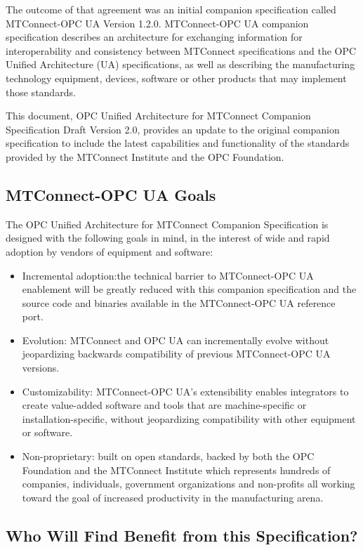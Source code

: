 \documentclass{mtconnect}	%
\begin{document}
The outcome of that agreement was an initial companion specification called MTConnect-OPC UA Version 1.2.0. MTConnect-OPC UA companion specification describes an architecture for exchanging information for interoperability and consistency between MTConnect specifications and the OPC Unified Architecture (UA) specifications, as well as describing the manufacturing technology equipment, devices, software or other products that may implement those standards.

This document, OPC Unified Architecture for MTConnect Companion Specification Draft Version 2.0, provides an update to the original companion specification to include the latest capabilities and functionality of the standards provided by the MTConnect Institute and the OPC Foundation.

\subsection{MTConnect-OPC UA Goals}

The OPC Unified Architecture for MTConnect Companion Specification is designed with the following goals in mind, in the interest of wide and rapid adoption by vendors of equipment and software:

\begin{itemize}
    \item Incremental adoption:the technical barrier to MTConnect-OPC UA enablement will be greatly reduced with this companion specification and the source code and binaries available in the MTConnect-OPC UA reference port.
    \item Evolution: MTConnect and OPC UA can incrementally evolve without jeopardizing backwards compatibility of previous MTConnect-OPC UA versions.
    \item Customizability: MTConnect-OPC UA's extensibility enables integrators to create value-added software and tools that are machine-specific or installation-specific, without jeopardizing compatibility with other equipment or software.
    \item Non-proprietary: built on open standards, backed by both the OPC Foundation and the MTConnect Institute which represents hundreds of companies, individuals, government organizations and non-profits all working toward the goal of increased productivity in the manufacturing arena.
\end{itemize}

\subsection{Who Will Find Benefit from this Specification?}
\end{document}
